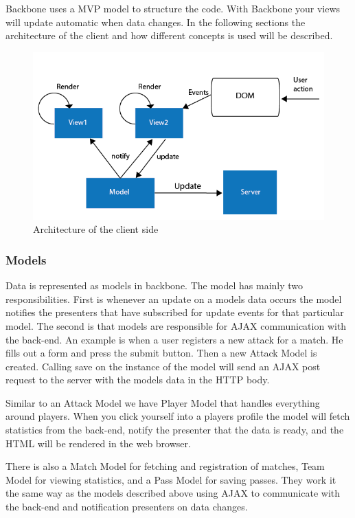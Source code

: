 Backbone uses a \ac{MVP} model to structure the code. With Backbone your views will update automatic when data changes. In the following sections the architecture of the client and how different concepts is used will be described. 


\begin{figure}[ht!]
\centering
\includegraphics[width=1\textwidth]{images/architecture/backbone_architecture.png}
\caption{Architecture of the client side}
\label{overflow}
\end{figure}

\subsubsection{Models}

Data is represented as models in backbone. The model has mainly two responsibilities. First is whenever an update on a models data occurs the model notifies the presenters that have subscribed for update events for that particular model. The second is that models are responsible for \ac{AJAX} communication with the back-end. An example is when a user registers a new attack for a match. He fills out a form and press the submit button. Then a new Attack Model is created. Calling save on the instance of the model will send an \ac{AJAX} post request to the server with the models data in the \ac{HTTP} body.

Similar to an Attack Model we have Player Model that handles everything around players. When you click yourself into a players profile the model will fetch statistics from the back-end, notify the presenter that the data is ready, and the \ac{HTML} will be rendered in the web browser.

There is also a Match Model for fetching and registration of matches, Team Model for viewing statistics, and a Pass Model for saving passes. They work it the same way as the models described above using \ac{AJAX} to communicate with the back-end and notification presenters on data changes.

